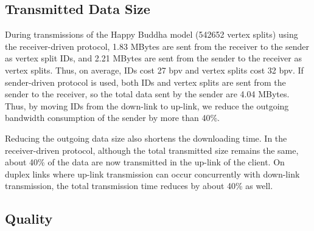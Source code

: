 \subsection{Transmitted Data Size}
During transmissions of the Happy Buddha model (542652 vertex splits) using 
the receiver-driven protocol, 1.83 MBytes are sent from the receiver
to the sender as vertex split IDs, and 2.21 MBytes are sent from the sender 
to the receiver as vertex splits. 
Thus, on average, IDs cost 27 bpv and vertex splits cost 32 bpv.
If sender-driven protocol is used, both IDs and 
vertex splits are sent from the sender to the receiver, so the total data 
sent by the sender are 4.04 MBytes. Thus, by moving IDs from the down-link to up-link, we reduce the outgoing bandwidth consumption of the sender by more than 40\%.

Reducing the outgoing data size also shortens the downloading time.
In the receiver-driven protocol, although the total transmitted size remains
the same, about 40\% of the data are now transmitted in the up-link of
the client.  On duplex links where up-link transmission can occur concurrently with down-link
transmission, the total transmission time reduces by about 40\% as well.
\subsection{Quality}

